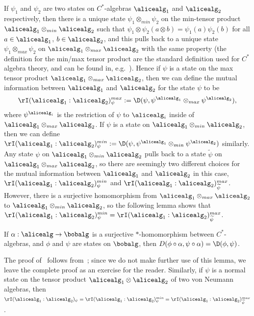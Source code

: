 If $\psi_1$ and $\psi_2$ are two states on $C^*$-algebras $\alicealg_1$ and $\alicealg_2$ respectively, then there is a unique state $\psi_1 \otimes_{min} \psi_2$ on the min-tensor product $\alicealg_1 \otimes_{min} \alicealg_2$ such that $\psi_1 \otimes \psi_2(a \otimes b) = \psi_1(a) \psi_2(b)$ for all $a \in \alicealg_1$, $b \in \alicealg_2$, and this pulls back to a unique state $\psi_1 \otimes_{max} \psi_2$ on $\alicealg_1 \otimes_{max} \alicealg_2$ with the same property (the definition for the min/max tensor product are the standard definition used for $C^*$ algebra theory, and can be found in, e.g.~\cite[Section 3.8]{goldbringConnesEmbeddingProblem2021}). Hence if $\psi$ is a state on the max tensor product $\alicealg_1 \otimes_{max} \alicealg_2$, then we can define the mutual information between $\alicealg_1$ and $\alicealg_2$ for the state $\psi$ to be 
\begin{equation*}
	\rI(\alicealg_1 : \alicealg_2)_{\psi}^{max} := \D(\psi, \psi^{\alicealg_1} \otimes_{max} \psi^{\alicealg_2}),
\end{equation*}
where $\psi^{\alicealg_i}$ is the restriction of $\psi$ to $\alicealg_i$ inside of $\alicealg_1 \otimes_{max} \alicealg_2$. 
If $\psi$ is a state on $\alicealg_1 \otimes_{min} \alicealg_2$, then we can define $\rI(\alicealg_1  : \alicealg_2)_{\psi}^{min} := \D(\psi, \psi^{\alicealg_1} \otimes_{min} \psi^{\alicealg_2})$ similarly. Any state $\psi$ on $\alicealg_1 \otimes_{min} \alicealg_2$ pulls back to a state $\widetilde{\psi}$ on $\alicealg_1 \otimes_{max} \alicealg_2$, so there are seemingly two different choices for the mutual information between $\alicealg_1$ and $\alicealg_2$ in this case, $\rI(\alicealg_1 : \alicealg_2)_{\psi}^{min}$ and $\rI(\alicealg_1 : \alicealg_2)_{\widetilde{\psi}}^{max}$. However, there is a surjective homomorphism from $\alicealg_1 \otimes_{max} \alicealg_2$ to $\alicealg_1 \otimes_{min} \alicealg_2$, so the following lemma shows that $\rI(\alicealg_1 : \alicealg_2)_{\psi}^{min} = \rI(\alicealg_1 : \alicealg_2)_{\widetilde{\psi}}^{max}$. 
\begin{lemma}\label{lem:naturalrelentropy}
	If $\alpha : \alicealg \to \bobalg$ is a surjective $*$-homomorphism between $C^*$-algebras, and $\phi$ and $\psi$ are states on $\bobalg$, then $D(\phi \circ \alpha, \psi \circ \alpha) = \D(\phi, \psi)$.
\end{lemma}
The proof of~ follows from~\cite[Theorem 6.19]{hiaiQuantumFDivergencesNeumann2021a}; since we do not make further use of this lemma, we leave the complete proof as an exercise for the reader. Similarly, if $\psi$ is a normal state on the tensor product $\alicealg_1 \otimes \alicealg_2$ of two von Neumann algebras, then $\rI(\alicealg_1 : \alicealg_2)_{\psi} = \rI(\alicealg_1 : \alicealg_2)_{\psi}^{min} = \rI(\alicealg_1 : \alicealg_2)_{\widetilde{\psi}}^{max}$. 

